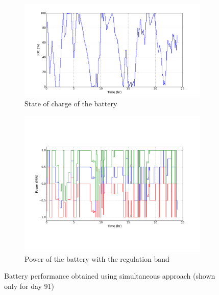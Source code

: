 \documentclass[11pt,twoside]{article}
\begin{document}
\begin{figure}[h!tp]
\centering
\begin{subfigure}[b]{0.49\textwidth} \includegraphics[width=\textwidth]{Figures/Plots/Simultaneous/SOC.pdf} \caption{State of charge of the battery}\label{socsim} \end{subfigure} \hfill
\begin{subfigure}[b]{0.49\textwidth} \includegraphics[width=\textwidth]{Figures/Plots/Simultaneous/P_band.pdf} \caption{Power of the battery with the regulation band}\label{pbandsim} \end{subfigure} \hfill
\caption{Battery performance obtained using simultaneous approach (shown only for day 91)}\label{perfsim}
\end{figure}
\end{document}
